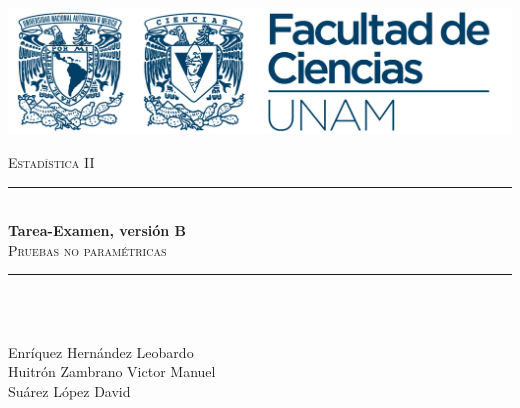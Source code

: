 \begin{titlepage}
	
	\newcommand{\HRule}{\rule{\linewidth}{0.5mm}} %
	
	\center %
	
	\includegraphics[]{logoFC_UNAM.png}\\ %
	
	\hspace*{2cm}

	\textsc{\large  Estadística II}\\[1.5cm] 
	
	
	\HRule \\[0.4cm]
	{ \Large \bfseries Tarea-Examen, versión B}\\[0.4cm] %
	\textsc{\Large  Pruebas no paramétricas}\\[1cm] %
	\HRule \\[1.2cm]
	
	
	\begin{minipage}{0.4\textwidth}
		\begin{flushleft} \large
			\emph{}\\
Enríquez Hernández Leobardo\\
Huitrón Zambrano Victor Manuel\\
Suárez López David\\
		\end{flushleft}
	\end{minipage}
	~


\end{titlepage}
